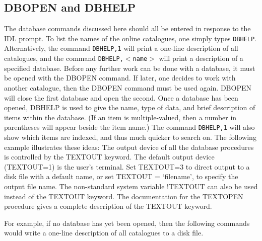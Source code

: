 \subsection{DBOPEN and DBHELP}
The database commands discussed here should all be entered in response
to the IDL prompt.  
To list the names of the online catalogues, one simply types {\tt DBHELP}.
Alternatively, the command {\tt DBHELP,1} will print a one-line description 
of all catalogues, and the command {\tt DBHELP,$<$name$>$} will
print a description of a specified database. 
Before any further work can be done with a database, it must be opened 
with the DBOPEN
command.  If later, one decides to work with another catalogue, then 
the DBOPEN command must be used again.  DBOPEN will close the first
database and open the second.  Once a database  has been opened, 
DBHELP is used to give the name, type of data, and brief description of items
within the database.   (If an item is multiple-valued, then a number in
parentheses will appear beside the item name.) The command 
{\tt DBHELP,1} will also show
which items are indexed, and thus much quicker to search on.
The following example illustrates these ideas:
\exbegin
{}
\exend
The output device of all the database procedures is controlled by the
TEXTOUT keyword.   The default output device (TEXTOUT=1) is the user's
terminal.   Set TEXTOUT=3 to direct output to a disk file with a default
name, or set TEXTOUT = `filename', to specify the output file name.   The
non-standard system variable !TEXTOUT can also be used instead of the
TEXTOUT keyword.    The documentation for the TEXTOPEN procedure gives a 
complete description of the TEXTOUT keyword.  

For example, if no database has yet been opened, 
then the following commands would write a one-line description of all catalogues
to a disk file.
\exbegin
{}
